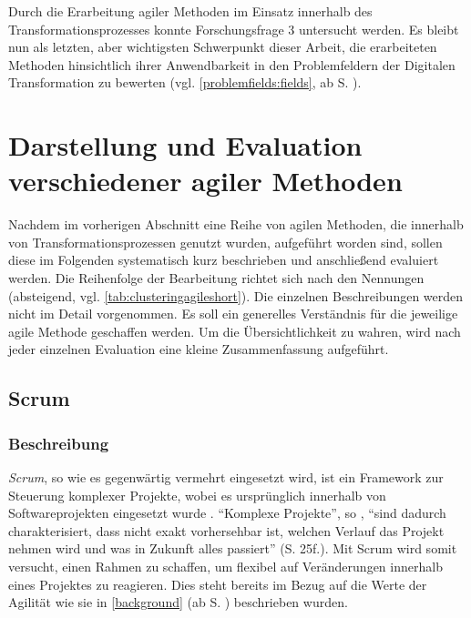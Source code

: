 Durch die Erarbeitung agiler Methoden im Einsatz innerhalb des Transformationsprozesses konnte Forschungsfrage 3 untersucht  werden. Es bleibt nun als letzten, aber wichtigsten Schwerpunkt dieser Arbeit, die erarbeiteten Methoden hinsichtlich ihrer Anwendbarkeit in den Problemfeldern der Digitalen Transformation zu bewerten (vgl. \ref{problemfields:fields}, ab S. \pageref{problemfields:fields}).

\section{Darstellung und Evaluation verschiedener agiler Methoden}
\label{agilepractices:evaluation}


Nachdem im vorherigen Abschnitt eine Reihe von agilen Methoden, die innerhalb von Transformationsprozessen genutzt wurden, aufgeführt worden sind, sollen diese im Folgenden systematisch kurz beschrieben und anschließend evaluiert werden. Die Reihenfolge der Bearbeitung richtet sich nach den Nennungen (absteigend, vgl. \ref{tab:clusteringagileshort}). Die einzelnen Beschreibungen werden nicht im Detail vorgenommen. Es soll ein generelles Verständnis für die jeweilige agile Methode geschaffen werden. Um die Übersichtlichkeit zu wahren, wird nach jeder einzelnen Evaluation eine kleine Zusammenfassung aufgeführt.

\subsection{Scrum}

\subsubsection{Beschreibung}

\textit{Scrum}, so wie es gegenwärtig vermehrt eingesetzt wird, ist ein Framework zur Steuerung komplexer Projekte, wobei es ursprünglich innerhalb von Softwareprojekten eingesetzt wurde \cite[S. 25]{wirdemann_scrum_2017}. ``Komplexe Projekte'', so , ``sind
dadurch charakterisiert, dass nicht exakt vorhersehbar ist, welchen Verlauf das Projekt nehmen wird und was in Zukunft alles passiert'' (S. 25f.). Mit Scrum wird somit versucht, einen Rahmen zu schaffen, um flexibel auf Veränderungen innerhalb eines Projektes zu reagieren. Dies steht bereits im Bezug auf die Werte der Agilität wie sie in \ref{background} (ab S. \pageref{background}) beschrieben wurden.

